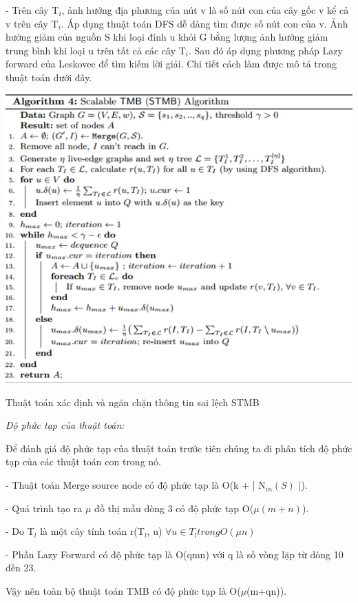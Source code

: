 		- Trên cây T$_{i}$, ảnh hưởng địa phương của nút v là số nút con của cây gốc v kể cả v trên cây T$_{i}$. Áp dụng thuật toán DFS dễ dàng tìm được số nút con của v. Ảnh hưởng giảm của nguồn S khi loại đỉnh u khỏi G bằng lượng ảnh hưởng giảm trung bình khi loại u trên tất cả các cây T$_{i}$. Sau đó áp dụng phương pháp Lazy forward của Leskovec \cite{krause} để tìm kiếm lời giải. Chi tiết cách làm được mô tả trong thuật toán dưới đây.
		
		\begin{center}
			\includegraphics[scale=.5]{picture/STMB}
			
			Thuật toán xác định và ngăn chặn thông tin sai lệch STMB
		\end{center}
	
		{\itshape Độ phức tạp của thuật toán: }
		
		Để đánh giá độ phức tạp của thuật toán trước tiên chúng ta đi phân tích độ phức tạp của các thuật toán con trong nó.
		
		- Thuật toán Merge source node có độ phức tạp là O(k + | N$_{in}(S)$ |).
		
		- Quá trình tạo ra $\mu$ đồ thị mẫu dòng 3 có độ phức tạp O($\mu(m + n)$).
		
		- Do T$_{l}$ là một cây tính toán r(T$_{l}$, u) $\forall u \in T_{l} trong O(\mu n)$ 
		
		- Phần Lazy Forward có độ phức tạp là O(qmn) với q là số vòng lặp từ dòng 10 đến 23.
		
		Vậy nên toàn bộ thuật toán TMB có độ phức tạp là O($\mu$(m+qn)).
	
